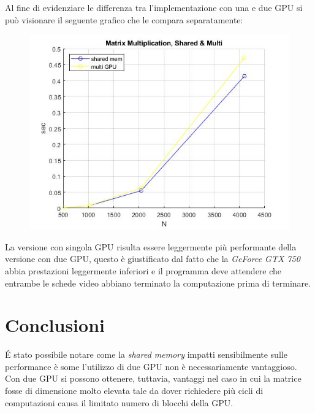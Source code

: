 \documentclass[12pt]{article}
\begin{document}
Al fine di evidenziare le differenza tra l'implementazione con una e due GPU si può visionare il seguente grafico che le compara separatamente:
\begin{figure}[h]
\includegraphics[width=\textwidth]{MatrixMul_sm.jpg}
\centering
\end{figure}

La versione con singola GPU risulta essere leggermente più performante della versione con due GPU, questo è giustificato dal fatto che la \emph{GeForce GTX 750} abbia prestazioni leggermente inferiori e il programma deve attendere che entrambe le schede video abbiano terminato la computazione prima di terminare.

\section{Conclusioni}
\'E stato possibile notare come la \emph{shared memory} impatti sensibilmente sulle performance è some l'utilizzo di due GPU non è necessariamente vantaggioso. Con due GPU si possono ottenere, tuttavia, vantaggi nel caso in cui la matrice fosse di dimensione molto elevata tale da dover richiedere più cicli di computazioni causa il limitato numero di blocchi della GPU.
\end{document}
